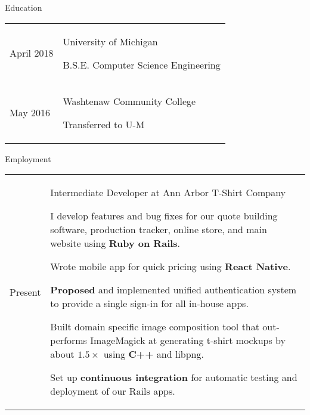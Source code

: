 \documentclass[12pt]{article}
\renewcommand{\section}[1]{{\Huge{#1}}\vspace{2 mm}}
\newenvironment{timeline}
        {\begin{tabular}{p{21 mm}|p{150 mm}}}
        {\end{tabular}}
\newenvironment{timelinetitle}
        {\vspace{-2 mm}\begin{large}}
        {\end{large}\vspace{-1.5 mm}}
\newcommand{\timespan}[2]{{#2}\newline{#1}}
\newcommand{\resumeitem}{\newline\vspace{3 mm}\hspace{3 mm}}
\begin{document}
\section{Education}
\hline

\begin{timeline}
\timespan{Sept. 2016}{April 2018}
&
\begin{timelinetitle}
    University of Michigan
\end{timelinetitle}
\hspace{16mm}
B.S.E. Computer Science Engineering
\vspace{3 mm}

\\

\timespan{Sept. 2012}{May 2016}
&
\begin{timelinetitle}
    Washtenaw Community College
\end{timelinetitle}
\hspace{29mm}
Transferred to U-M

\end{timeline}

\vspace{3.0 mm}
\section{Employment}
\hline

\begin{timeline}
\timespan{Feb. 2014}{Present}
&
\begin{timelinetitle}
    Intermediate Developer at Ann Arbor T-Shirt Company
\end{timelinetitle}
\vspace{1 mm}

\resumeitem I develop features and bug fixes for our quote building software,
      production tracker, online store, and main website using \textbf{Ruby on Rails}.

\resumeitem Wrote mobile app for quick pricing using \textbf{React Native}.

\resumeitem \textbf{Proposed} and implemented unified authentication system to provide a single
      sign-in for all in-house apps.

\resumeitem Built domain specific image composition tool that out-performs ImageMagick
      at generating t-shirt mockups by about $1.5\times$ using \textbf{C++} and libpng.

\resumeitem Set up \textbf{continuous integration} for automatic testing and deployment of
      our Rails apps.

\end{timeline}
\end{document}
